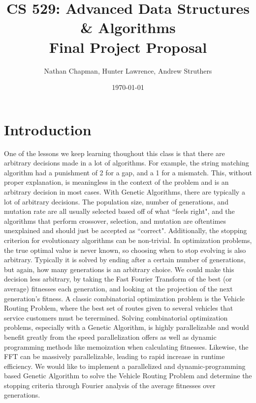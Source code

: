 \documentclass{article}
\title{\vspace*{-0.625in}CS 529: Advanced Data Structures \& Algorithms \\ Final Project Proposal}
\author{Nathan Chapman, Hunter Lawrence, Andrew Struthers}
\date{\today}
\renewcommand{\_}{\ifincsname_\else\legacyunderscore\fi}
\begin{document}
    \maketitle

\section*{Introduction}
One of the lessons we keep learning thoughout this class is that there are arbitrary decisions made in a lot of algorithms. For example, the string matching algorithm had a punishment of 2 for a gap, and a 1 for a mismatch. This, without proper explanation, is meaningless in the context of the problem and is an arbitrary decision in most cases. With Genetic Algorithms, there are typically a lot of arbitrary decisions. The population size, number of generations, and mutation rate are all usually selected based off of what ``feels right", and the algorithms that perform crossover, selection, and mutation are oftentimes unexplained and should just be accepted as ``correct". Additionally, the stopping criterion for evolutionary algorithms can be non-trivial. In optimization problems, the true optimal value is never known, so choosing when to stop evolving is also arbitrary. Typically it is solved by ending after a certain number of generations, but again, how many generations is an arbitrary choice. We could make this decision less arbitrary, by taking the Fast Fourier Transform of the best (or average) fitnesses each generation, and looking at the projection of the next generation's fitness. A classic combinatorial optimization problem is the Vehicle Routing Problem, where the best set of routes given to several vehicles that service customers must be terermined\cite{towardsdatascienceVehicleRouting}. Solving combinatorial optimization problems, especially with a Genetic Algorithm, is highly parallelizable and would benefit greatly from the speed parallelization offers as well as dynamic programming methods like memoization when calculating fitnesses. Likewise, the FFT can be massively parallelizable, leading to rapid increase in runtime efficiency. We would like to implement a parallelized and dynamic-programming based Genetic Algorithm to solve the Vehicle Routing Problem and determine the stopping criteria through Fourier analysis of the average fitnesses over generations. 
\end{document}
